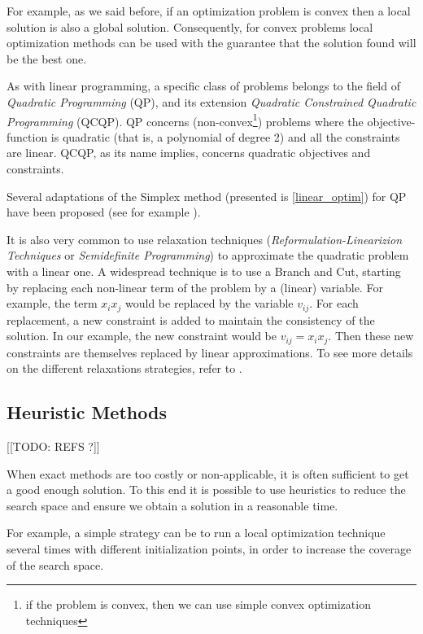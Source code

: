 For example, as we said before, if an optimization problem is convex then a local solution is also a global solution. Consequently, for convex problems local optimization methods can be used with the guarantee that the solution found will be the best one.

As with linear programming, a specific class of problems belongs to the field of \emph{Quadratic Programming} (QP), and its extension \emph{Quadratic Constrained Quadratic Programming} (QCQP). QP concerns (non-convex\footnote{if the problem is convex, then we can use simple convex optimization techniques}) problems where the objective-function is quadratic (that is, a polynomial of degree 2) and all the constraints are linear. QCQP, as its name implies, concerns quadratic objectives and constraints.

Several adaptations of the Simplex method (presented is \ref{linear_optim}) for QP have been proposed (see for example \cite{wolfe1959simplex, dantzig1998linear, van1964simplicial}).

It is also very common to use relaxation techniques (\emph{Reformulation-Linearizion Techniques} or \emph{Semidefinite Programming}) to approximate the quadratic problem with a linear one. A widespread technique is to use a Branch and Cut, starting by replacing each non-linear term of the problem by a (linear) variable. For example, the term $x_ix_j$ would be replaced by the variable $v_{ij}$. For each replacement, a new constraint is added to maintain the consistency of the solution. In our example, the new constraint would be $v_{ij} = x_ix_j$. Then these new constraints are themselves replaced by linear approximations.
To see more details on the different relaxations strategies, refer to \cite{audet2000branch}.

\subsection{Heuristic Methods}\label{optim_heuristic}

[[TODO: REFS ?]]

When exact methods are too costly or non-applicable, it is often sufficient to get a good enough solution. To this end it is possible to use heuristics to reduce the search space and ensure we obtain a solution in a reasonable time.

For example, a simple strategy can be to run a local optimization technique several times with different initialization points, in order to increase the coverage of the search space.

